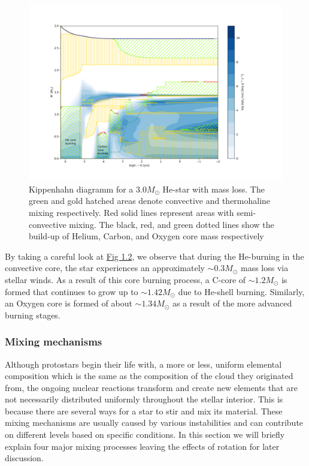 \documentclass[../../main/thesis_msc.tex]{subfiles}
\begin{document}
				\begin{figure}[h]
					\centering
					\includegraphics[width=\textwidth]{../figures/chapter1/Kippenhahn_3p0_ch1_with_text_final.png}
					\caption{Kippenhahn diagramm for a $3.0 M_{\odot}$ He-star with mass loss. The green and gold hatched areas denote convective and thermohaline mixing respectively. Red solid lines represent areas with semi-convective mixing. The black, red, and green dotted lines show the build-up of Helium, Carbon, and Oxygen core mass respectively}
					\label{fig:Kipp_3p0_ch1}
				\end{figure}
				
				By taking a careful look at \hyperref[fig:Kipp_3p0_ch1]{Fig 1.2}, we observe that during the He-burning in the convective core, the star experiences an approximately $\sim 0.3 M_{\odot}$ mass loss via stellar winds. As a result of this core burning process, a C-core of $\sim 1.2 M_{\odot}$ is formed that continues to grow up to $\sim 1.42 M_{\odot}$ due to He-shell burning. Similarly, an Oxygen core is formed of about $\sim 1.34 M_{\odot}$ as a result of the more advanced burning stages.
				
				
				
				
				
				
					\subsubsection{Mixing mechanisms}
					
						Although protostars begin their life with, a more or less, uniform elemental composition which is the same as the composition of the cloud they originated from, the ongoing nuclear reactions transform and create new elements that are not necessarily distributed uniformly throughout the stellar interior. This is because there are several ways for a star to stir and mix its material. These mixing mechanisms are usually caused by various instabilities and can contribute on different levels based on specific conditions. In this section we will briefly explain four major mixing processes leaving the effects of rotation for later discussion.
						
\end{document}
